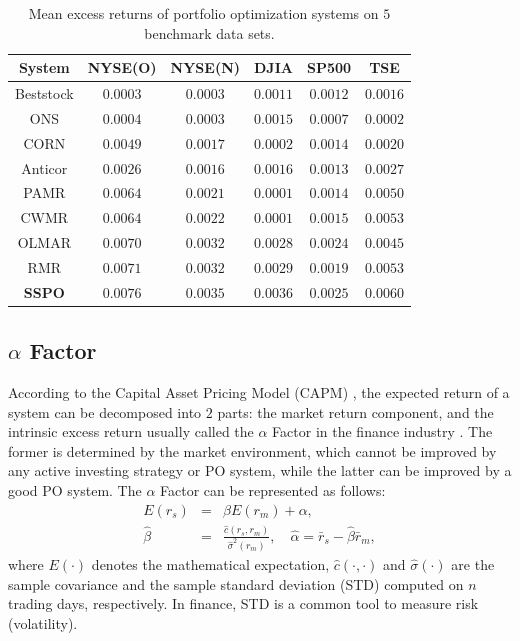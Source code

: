 \documentclass[twoside,11pt]{article}
\begin{document}
\begin{table}[!htb]
\centering
\footnotesize
\begin{tabular}{|c|c|c|c|c|c|}
\hline
 System & {NYSE(O)}  &  {NYSE(N)}  &{DJIA}  & {SP500}  &  {TSE}   \\
  \hline
  Beststock   & $0.0003$  &  $0.0003$   & $0.0011$   & $0.0012$   & $0.0016$   \\
    ONS   & $0.0004$  & $0.0003$   & $0.0015$   & $0.0007$   & $0.0002$  \\
  CORN     & $0.0049$    & $0.0017$  & $0.0002$  & $0.0014$  & $0.0020$  \\
  Anticor     & $0.0026$   & $0.0016$   & $0.0016$  & $0.0013$  & $0.0027$  \\
  PAMR     & $0.0064$    & $0.0021$  & $0.0001$  & $0.0014$   & $0.0050$ \\
  CWMR     & $0.0064$    & $0.0022$  & $0.0001$  & $0.0015$   & $0.0053$ \\
  OLMAR     & $0.0070$    & $0.0032$  & $0.0028$  & $0.0024$  & $0.0045$  \\
  RMR    & $0.0071$   & $0.0032$  & $0.0029$ & $0.0019$  & $0.0053$ \\
\hline
  \textbf{SSPO}  & $\mathbf{0.0076}$  & $\mathbf{0.0035}$  &  $\mathbf{0.0036}$  &  $\mathbf{0.0025}$  & $\mathbf{0.0060}$  \\
  \hline
\end{tabular}
\normalsize
\caption{Mean excess returns of portfolio optimization systems on $5$ benchmark data sets.}
\label{tab:mer}
\end{table}





\subsection{$\alpha$ Factor}
\label{sec:alphafactor}
According to the Capital Asset Pricing Model (CAPM) \citep{CAPM}, the expected return of a system can be decomposed into $2$ parts: the market return component, and the intrinsic excess return usually called the $\alpha$ Factor in the finance industry \citep{portalpha0}. The former is determined by the market environment, which cannot be improved by any active investing strategy or PO system, while the latter can be improved by a good PO system. The $\alpha$ Factor can be represented as follows:
\begin{eqnarray}
\label{eqn:alphafactor}
E({r}_{s})&=&\beta E({r}_{m})+\alpha,\\
\label{eqn:betaestimate}
\hat{\beta}&=&\frac{\hat{c}({r}_{s},{r}_{m})}{\hat{\sigma}^2({r}_{m})},\quad \hat{\alpha}=\bar{r}_{s}-\hat{\beta}\bar{r}_{m},
\end{eqnarray}
where $E(\cdot)$ denotes the mathematical expectation, $\hat{c}(\cdot,\cdot)$ and $\hat{\sigma}(\cdot)$ are the sample covariance and the sample standard deviation (STD) computed on $n$ trading days, respectively. In finance, STD is a common tool to measure risk (volatility).
\end{document}
